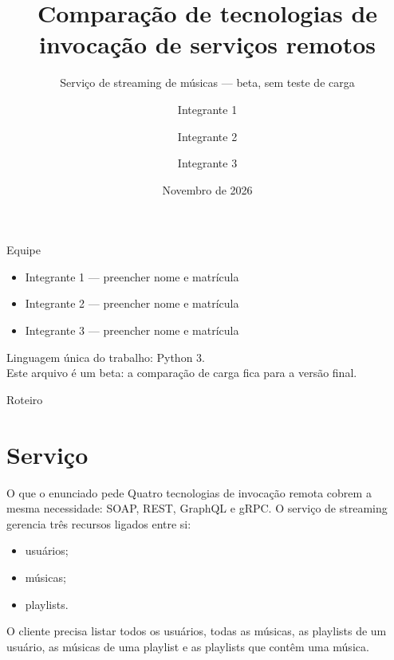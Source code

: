\documentclass[aspectratio=169,11pt]{beamer}
\title{Comparação de tecnologias de invocação de serviços remotos}
\subtitle{Serviço de streaming de músicas --- beta, sem teste de carga}
\author{Integrante 1 \and Integrante 2 \and Integrante 3}
\institute{Computação Distribuída\\Prof. Nabor C. Mendonça}
\date{Novembro de 2026}
\begin{document}
\begin{frame}
  \titlepage
\end{frame}

\begin{frame}{Equipe}
  \begin{itemize}
    \item Integrante 1 --- preencher nome e matrícula
    \item Integrante 2 --- preencher nome e matrícula
    \item Integrante 3 --- preencher nome e matrícula
  \end{itemize}
  Linguagem única do trabalho: Python 3.\\
  Este arquivo é um beta: a comparação de carga fica para a versão final.
\end{frame}

\begin{frame}{Roteiro}
  \tableofcontents
\end{frame}

\section{Serviço}

\begin{frame}{O que o enunciado pede}
  Quatro tecnologias de invocação remota cobrem a mesma necessidade: SOAP, REST, GraphQL e gRPC.
  \vspace{0.4em}
  O serviço de streaming gerencia três recursos ligados entre si:
  \begin{itemize}
    \item usuários;
    \item músicas;
    \item playlists.
  \end{itemize}
  O cliente precisa listar todos os usuários, todas as músicas, as playlists de um usuário, as músicas de uma playlist e as playlists que contêm uma música.
\end{frame}
\end{document}
